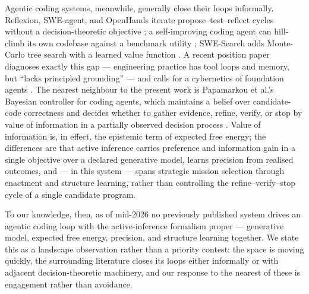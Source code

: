 Agentic coding systems, meanwhile, generally close their loops informally.  Reflexion, SWE-agent, and OpenHands iterate propose--test--reflect cycles without a decision-theoretic objective \cite{shinn2023reflexion,yang2024sweagent,wang2025openhands}; a self-improving coding agent can hill-climb its own codebase against a benchmark utility \cite{robeyns2025sica}; SWE-Search adds Monte-Carlo tree search with a learned value function \cite{antoniades2024swesearch}.  A recent position paper diagnoses exactly this gap --- engineering practice has tool loops and memory, but ``lacks principled grounding'' --- and calls for a cybernetics of foundation agents \cite{wang2026cybernetics}.  The nearest neighbour to the present work is Papamarkou et al.'s Bayesian controller for coding agents, which maintains a belief over candidate-code correctness and decides whether to gather evidence, refine, verify, or stop by value of information in a partially observed decision process \cite{papamarkou2026bayesian}.  Value of information is, in effect, the epistemic term of expected free energy; the differences are that active inference carries preference and information gain in a single objective over a declared generative model, learns precision from realised outcomes, and --- in this system --- spans strategic mission selection through enactment and structure learning, rather than controlling the refine--verify--stop cycle of a single candidate program.

To our knowledge, then, as of mid-2026 no previously published system drives an agentic coding loop with the active-inference formalism proper --- generative model, expected free energy, precision, and structure learning together.  We state this as a landscape observation rather than a priority contest: the space is moving quickly, the surrounding literature closes its loops either informally or with adjacent decision-theoretic machinery, and our response to the nearest of these is engagement rather than avoidance.


